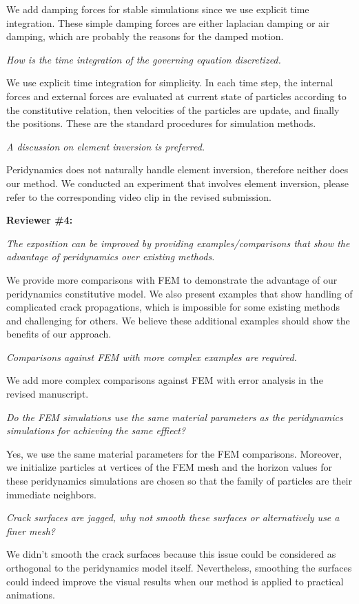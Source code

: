 We add damping forces for stable simulations since we use explicit time integration. These simple damping forces are either laplacian damping or air damping, which are probably the reasons for the damped motion.

\emph{How is the time integration of the governing equation discretized.}

We use explicit time integration for simplicity. In each time step, the internal forces and external forces are evaluated at current state of particles according to the constitutive relation, then velocities of the particles are update, and finally the positions. These are the standard procedures for simulation methods.

\emph{A discussion on element inversion is preferred.}

Peridynamics does not naturally handle element inversion, therefore neither does our method. We conducted an experiment that involves element inversion, please refer to the corresponding video clip in the revised submission.

\noindent{}\textbf{Reviewer \#4:}

\emph{The exposition can be improved by providing examples/comparisons that show the advantage of peridynamics over existing methods.}

We provide more comparisons with FEM to demonstrate the advantage of our peridynamics constitutive model. We also present examples that show handling of complicated crack propagations, which is impossible for some existing methods and challenging for others. We believe these additional examples should show the benefits of our approach.

\emph{Comparisons against FEM with more complex examples are required.}

We add more complex comparisons against FEM with error analysis in the revised manuscript.

\emph{Do the FEM simulations use the same material parameters as the peridynamics simulations for achieving the same effiect?}

Yes, we use the same material parameters for the FEM comparisons. Moreover, we initialize particles at vertices of the FEM mesh and the horizon values for these peridynamics simulations are chosen so that the family of particles are their immediate neighbors.

\emph{Crack surfaces are jagged, why not smooth these surfaces or alternatively use a finer mesh?}

We didn't smooth the crack surfaces because this issue could be considered as orthogonal to the peridynamics model itself. Nevertheless, smoothing the surfaces could indeed improve the visual results when our method is applied to practical animations.



%





